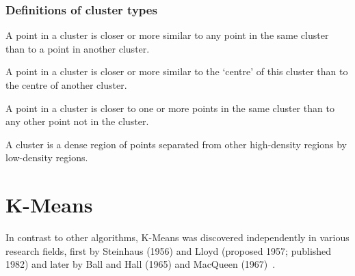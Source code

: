 \documentclass[10pt,twocolumn,letterpaper]{article}
\begin{document}
\subsubsection{Definitions of cluster types~\cite{Joshi2015}}

\begin{definition}
    \label{def:well-separated}
    A point in a cluster is closer or more similar to any point in the same cluster
    than to a point in another cluster.
\end{definition}

\begin{definition}
    \label{def:centre-based}
    A point in a cluster is closer or more similar to the ‘centre’ of this cluster
    than to the centre of another cluster.
\end{definition}

\begin{definition}
    \label{def:contiguous}
    A point in a cluster is closer to one or more points in the same cluster than to
    any other point not in the cluster.
\end{definition}

\begin{definition}
    \label{def:density-based}
    A cluster is a dense region of points separated from other high-density
    regions by low-density regions.
\end{definition}


\section{K-Means}\label{sec:k-means}

In contrast to other algorithms, K-Means was discovered independently in
various research fields, first by Steinhaus (1956) and Lloyd (proposed 1957;
published 1982) and later by Ball and Hall (1965) and MacQueen
(1967)~\cite{Jain2010651}.
\end{document}
